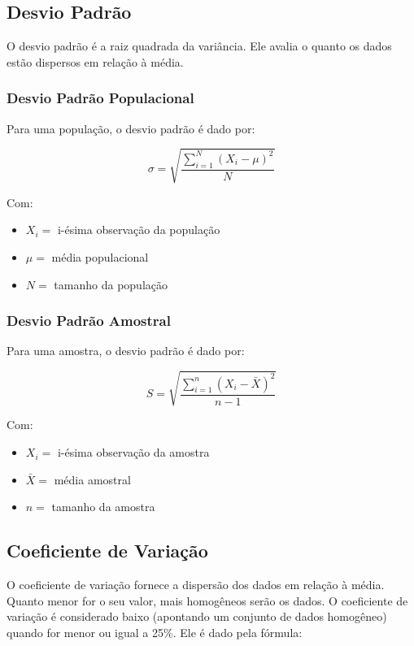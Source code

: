 \documentclass[
  portuguese,
]{estat/estat}
\begin{document}
\subsection{Desvio Padrão}\label{desvio-padruxe3o}

O desvio padrão é a raiz quadrada da variância. Ele avalia o quanto os
dados estão dispersos em relação à média.

\subsubsection{Desvio Padrão
Populacional}\label{desvio-padruxe3o-populacional}

Para uma população, o desvio padrão é dado por:

\[\sigma=\sqrt{\frac{\sum\limits_{i=1}^{N}\left(X_i - \mu\right)^2}{N}}\]

Com:

\begin{itemize}
\item
  \(X_i =\) i-ésima observação da população
\item
  \(\mu =\) média populacional
\item
  \(N =\) tamanho da população
\end{itemize}

\subsubsection{Desvio Padrão Amostral}\label{desvio-padruxe3o-amostral}

Para uma amostra, o desvio padrão é dado por:

\[S=\sqrt{\frac{\sum\limits_{i=1}^{n}\left(X_i - \bar{X}\right)^2}{n-1}}\]

Com:

\begin{itemize}
\item
  \(X_i =\) i-ésima observação da amostra
\item
  \(\bar{X} =\) média amostral
\item
  \(n =\) tamanho da amostra
\end{itemize}

\subsection{Coeficiente de
Variação}\label{coeficiente-de-variauxe7uxe3o}

O coeficiente de variação fornece a dispersão dos dados em relação à
média. Quanto menor for o seu valor, mais homogêneos serão os dados. O
coeficiente de variação é considerado baixo (apontando um conjunto de
dados homogêneo) quando for menor ou igual a 25\%. Ele é dado pela
fórmula:
\end{document}
